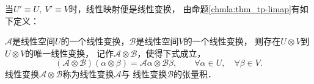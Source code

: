 当$U'\equiv U, \ V'\equiv V$时，线性映射便是线性变换，
由命题\ref{chmla:thm_tp-limap}有如下定义：
\begin{definition}
    $\mathcal{A}$是线性空间$U$的一个线性变换，$\mathcal{B}$是线性空间$V$的一个线性变换，
    则存在$U\otimes V$到$U\otimes V$的唯一线性变换，
    记作$\mathcal{A}\otimes \mathcal{B}$，使得下式成立，
    \begin{equation}
        (\mathcal{A}\otimes \mathcal{B}) (\alpha \otimes \beta )
        =\mathcal{A}\alpha \otimes \mathcal{B}\beta ,
        \qquad \forall \alpha \in U, \quad \forall \beta\in V.
    \end{equation}
    线性变换$\mathcal{A}\otimes \mathcal{B}$称为线性变换$\mathcal{A}$与
    线性变换$\mathcal{B}$的{\heiti 张量积}．
\end{definition}

